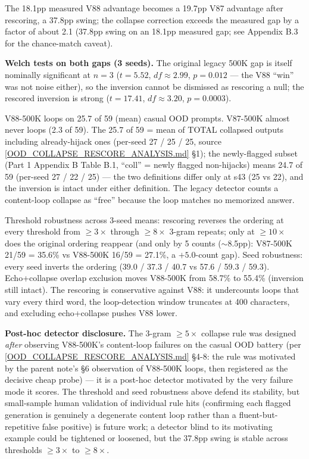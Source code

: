\documentclass[11pt]{article}
\begin{document}
The 18.1pp measured V88 advantage becomes a 19.7pp V87 advantage after rescoring, a 37.8pp swing; the collapse correction exceeds the measured gap by a factor of about 2.1 (37.8pp swing on an 18.1pp measured gap; see Appendix B.3 for the chance-match caveat).

\textbf{Welch tests on both gaps (3 seeds).} The original legacy 500K gap is itself nominally significant at $n=3$ ($t = 5.52$, $df \approx 2.99$, $p = 0.012$ --- the V88 ``win'' was not noise either), so the inversion cannot be dismissed as rescoring a null; the rescored inversion is strong ($t = 17.41$, $df \approx 3.20$, $p = 0.0003$).

V88-500K loops on 25.7 of 59 (mean) casual OOD prompts. V87-500K almost never loops (2.3 of 59). The 25.7 of 59 = mean of TOTAL collapsed outputs including already-hijack ones (per-seed 27 / 25 / 25, source \href{https://github.com/llaa33219/MicroMixer-4/blob/4bb630413dfa58ef3141291e121ab8c006d03235/OOD_COLLAPSE_RESCORE_ANALYSIS.md}{[OOD\_COLLAPSE\_RESCORE\_ANALYSIS.md]} \S1); the newly-flagged subset (Part 1 Appendix B Table B.1, ``coll'' = newly flagged non-hijacks) means 24.7 of 59 (per-seed 27 / 22 / 25) --- the two definitions differ only at s43 (25 vs 22), and the inversion is intact under either definition. The legacy detector counts a content-loop collapse as ``free'' because the loop matches no memorized answer.

Threshold robustness across 3-seed means: rescoring reverses the ordering at every threshold from $\geq 3\times$ through $\geq 8\times$ 3-gram repeats; only at $\geq 10\times$ does the original ordering reappear (and only by 5 counts ($\sim$8.5pp): V87-500K 21/59 = 35.6\% vs V88-500K 16/59 = 27.1\%, a $+5.0$-count gap). Seed robustness: every seed inverts the ordering (39.0 / 37.3 / 40.7 vs 57.6 / 59.3 / 59.3). Echo+collapse overlap exclusion moves V88-500K from 58.7\% to 55.4\% (inversion still intact). The rescoring is conservative against V88: it undercounts loops that vary every third word, the loop-detection window truncates at 400 characters, and excluding echo+collapse pushes V88 lower.

\textbf{Post-hoc detector disclosure.} The 3-gram $\geq 5\times$ collapse rule was designed \emph{after} observing V88-500K's content-loop failures on the casual OOD battery (per \href{https://github.com/llaa33219/MicroMixer-4/blob/4bb630413dfa58ef3141291e121ab8c006d03235/OOD_COLLAPSE_RESCORE_ANALYSIS.md}{[OOD\_\allowbreak COLLAPSE\_\allowbreak RESCORE\_\allowbreak ANALYSIS.md]} \S4-8: the rule was motivated by the parent note's \S6 observation of V88-500K loops, then registered as the decisive cheap probe) --- it is a post-hoc detector motivated by the very failure mode it scores. The threshold and seed robustness above defend its stability, but small-sample human validation of individual rule hits (confirming each flagged generation is genuinely a degenerate content loop rather than a fluent-but-repetitive false positive) is future work; a detector blind to its motivating example could be tightened or loosened, but the 37.8pp swing is stable across thresholds $\geq 3\times$ to $\geq 8\times$.
\end{document}
